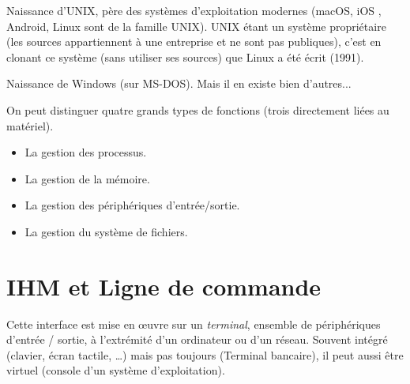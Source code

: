 \noindent\date{1970} Naissance d'UNIX, père des systèmes d'exploitation modernes (macOS, iOS
, Android, Linux sont de la famille UNIX). UNIX étant un système propriétaire (les sources appartiennent à une entreprise et ne sont pas publiques), c'est en clonant ce système (sans utiliser ses sources) que Linux a été écrit (1991).

\noindent\date{1985} Naissance de Windows (sur MS-DOS). Mais il en existe bien d'autres...

\medskip

On peut distinguer quatre grands types de fonctions (trois directement liées au matériel).

\begin{itemize}
	\item La gestion des processus.
	\item La gestion de la mémoire.
	\item La gestion des périphériques d'entrée/sortie.
	\item La gestion du système de fichiers.
\end{itemize}

\section{IHM et Ligne de commande}


Cette interface est mise en œuvre sur un \emph{terminal}, ensemble de périphériques d'entrée / sortie, à l'extrémité d'un ordinateur ou d'un réseau. Souvent intégré (clavier, écran tactile, \ldots) mais pas toujours (Terminal bancaire), il peut aussi être virtuel (console  d'un système d'exploitation).

